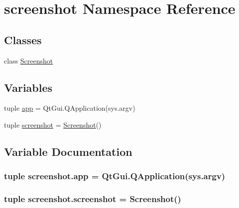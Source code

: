 \hypertarget{namespacescreenshot}{}\section{screenshot Namespace Reference}
\label{namespacescreenshot}
\subsection*{Classes}
\begin{DoxyCompactItemize}
\item 
class \hyperlink{classscreenshot_1_1Screenshot}{Screenshot}
\end{DoxyCompactItemize}
\subsection*{Variables}
\begin{DoxyCompactItemize}
\item 
tuple \hyperlink{namespacescreenshot_a1e7846ad857b0204e1cdd0bdd141d10c}{app} = Qt\+Gui.\+Q\+Application(sys.\+argv)
\item 
tuple \hyperlink{namespacescreenshot_af0cb8842c30fce67101c6c211c7f0c50}{screenshot} = \hyperlink{classscreenshot_1_1Screenshot}{Screenshot}()
\end{DoxyCompactItemize}


\subsection{Variable Documentation}
\hypertarget{namespacescreenshot_a1e7846ad857b0204e1cdd0bdd141d10c}{}
\subsubsection[{app}]{\setlength{\rightskip}{0pt plus 5cm}tuple screenshot.\+app = Qt\+Gui.\+Q\+Application(sys.\+argv)}\label{namespacescreenshot_a1e7846ad857b0204e1cdd0bdd141d10c}
\hypertarget{namespacescreenshot_af0cb8842c30fce67101c6c211c7f0c50}{}
\subsubsection[{screenshot}]{\setlength{\rightskip}{0pt plus 5cm}tuple screenshot.\+screenshot = {\bf Screenshot}()}\label{namespacescreenshot_af0cb8842c30fce67101c6c211c7f0c50}
